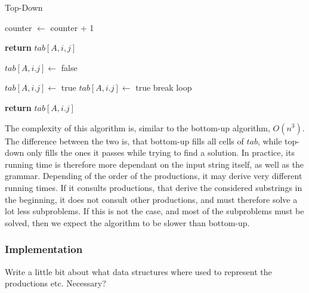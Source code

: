\begin{algorithm}[H]
    \caption{Top-Down}
    \label{alg:td}
    \begin{algorithmic}[1]
            \State counter $\leftarrow$ counter + 1

                \State \textbf{return} $tab[A,i,j]$
            \EndIf

            \State $tab[A,i.j]\leftarrow$ false

                    \State $tab[A,i.j]\leftarrow$ true
                \EndIf
            \Else
                        \State $tab[A,i.j]\leftarrow$ true
                        \State break loop
                        \EndIf
                    \EndFor
                \EndFor
            \EndIf

            \State \textbf{return} $tab[A,i.j]$
        \EndFunction
    \end{algorithmic}
\end{algorithm}

The complexity of this algorithm is, similar to the bottom-up algorithm, $O(n^3)$.
The difference between the two is, that bottom-up fills all cells of $tab$, while top-down only fills the ones it passes while trying to find a solution.
In practice, its running time is therefore more dependant on the input string itself, as well as the grammar.
Depending of the order of the productions, it may derive very different running times.
If it consults productions, that derive the considered substrings in the beginning, it does not consult other productions, and must therefore solve a lot less subproblems.
If this is not the case, and most of the subproblems must be solved, then we expect the algorithm to be slower than bottom-up.

\subsubsection{Implementation}
Write a little bit about what data structures where used to represent the productions etc. Necessary?



